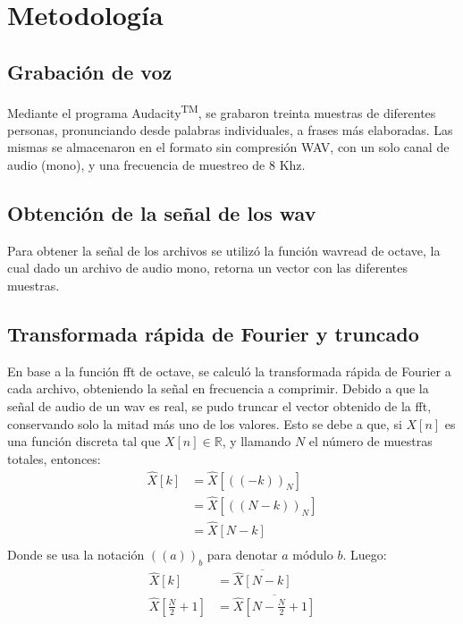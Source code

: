 \documentclass[a4paper,11pt]{article}
\begin{document}
\section{Metodolog\'ia}

\subsection{Grabación de voz}
Mediante el programa Audacity\textsuperscript{TM}, se grabaron treinta muestras
de diferentes personas, pronunciando desde palabras individuales, a frases más
elaboradas. Las mismas se almacenaron en el formato sin compresión WAV, con un
solo canal de audio (mono), y una frecuencia de muestreo de $8$ Khz.
\subsection{Obtención de la señal de los wav}
Para obtener la señal de los archivos se utilizó la función wavread de octave,
la cual dado un archivo de audio mono, retorna un vector con las diferentes
muestras.
\subsection{Transformada rápida de Fourier y truncado}
En base a la función fft de octave, se calculó la transformada rápida de
Fourier a cada archivo, obteniendo la señal en frecuencia a comprimir.
Debido a que la señal de audio de un wav es real, se pudo truncar el vector
obtenido de la fft, conservando solo la mitad más uno de los valores. Esto se
debe a que, si $X[n]$ es una función discreta tal que $X[n] \in
\mathbb{R}$, y llamando $N$ el número de muestras totales, entonces:
\begin{equation} \label{eq1}
    \begin{split}
        \hat{X}[k] & = \hat{X}[((-k))_N] \\
         & = \hat{X}[((N - k))_N] \\
         & = \hat{X}[N-k] \\
     \end{split}
\end{equation}
Donde se usa la notación $((a))_b$ para denotar $a$ módulo $b$.
Luego:
\begin{equation} \label{eq2}
    \begin{split}
        \hat{X}[k] & = \overline{\hat{X}[N-k]} \\
        \hat{X}[\frac{N}{2}+1] & = \overline{\hat{X}[N-\frac{N}{2}+1]} \\
     \end{split}
\end{equation}
\end{document}
